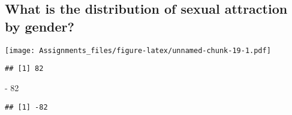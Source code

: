 \documentclass[
]{article}
\newenvironment{Shaded}{\begin{snugshade}}{\end{snugshade}}
\newcommand{\AttributeTok}[1]{\textcolor[rgb]{0.77,0.63,0.00}{#1}}
\newcommand{\CommentTok}[1]{\textcolor[rgb]{0.56,0.35,0.01}{\textit{#1}}}
\newcommand{\ConstantTok}[1]{\textcolor[rgb]{0.00,0.00,0.00}{#1}}
\newcommand{\DecValTok}[1]{\textcolor[rgb]{0.00,0.00,0.81}{#1}}
\newcommand{\FunctionTok}[1]{\textcolor[rgb]{0.00,0.00,0.00}{#1}}
\newcommand{\NormalTok}[1]{#1}
\newcommand{\OtherTok}[1]{\textcolor[rgb]{0.56,0.35,0.01}{#1}}
\newcommand{\SpecialCharTok}[1]{\textcolor[rgb]{0.00,0.00,0.00}{#1}}
\newcommand{\StringTok}[1]{\textcolor[rgb]{0.31,0.60,0.02}{#1}}
\begin{document}
\hypertarget{what-is-the-distribution-of-sexual-attraction-by-gender}{%
\subsection{What is the distribution of sexual attraction by
gender?}\label{what-is-the-distribution-of-sexual-attraction-by-gender}}

\begin{Shaded}
\end{Shaded}

\texttt{[image: Assignments\_files/figure-latex/unnamed-chunk-19-1.pdf]}

\begin{Shaded}
\end{Shaded}

\begin{verbatim}
## [1] 82
\end{verbatim}

\begin{Shaded}
\begin{Highlighting}[]
\SpecialCharTok{{-}} \DecValTok{82}
\end{Highlighting}
\end{Shaded}

\begin{verbatim}
## [1] -82
\end{verbatim}

\begin{Shaded}
\end{Shaded}
\end{document}

